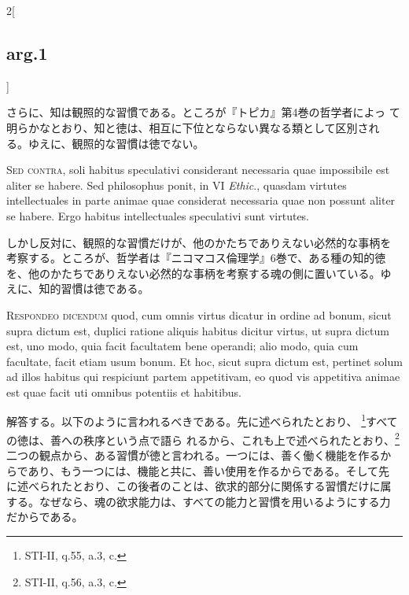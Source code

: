 \documentclass[paper=a4paper,fontsize=10pt,jafontsize=9pt,titlepage]{jlreq}
\begin{document}
\begin{paracol}{2}[\subsection{arg.1}]
\switchcolumn

さらに、知は観照的な習慣である。ところが『トピカ』第4巻の哲学者によっ
て明らかなとおり、知と徳は、相互に下位とならない異なる類として区別され
る。ゆえに、観照的な習慣は徳でない。

\switchcolumn*[\subsection{s.c.}]

{\scshape Sed contra}, soli habitus speculativi considerant necessaria
 quae impossibile est aliter se habere. Sed philosophus ponit, in VI
 {\itshape Ethic}., quasdam virtutes intellectuales in parte animae
 quae considerat necessaria quae non possunt aliter se habere. Ergo
 habitus intellectuales speculativi sunt virtutes.

\switchcolumn

しかし反対に、観照的な習慣だけが、他のかたちでありえない必然的な事柄を
考察する。ところが、哲学者は『ニコマコス倫理学』6巻で、ある種の知的徳
を、他のかたちでありえない必然的な事柄を考察する魂の側に置いている。ゆ
えに、知的習慣は徳である。


{\scshape Respondeo dicendum} quod, cum omnis virtus dicatur in ordine
ad bonum, sicut supra dictum est, duplici ratione aliquis habitus
dicitur virtus, ut supra dictum est, uno modo, quia facit facultatem
bene operandi; alio modo, quia cum facultate, facit etiam usum
bonum. Et hoc, sicut supra dictum est, pertinet solum ad illos habitus
qui respiciunt partem appetitivam, eo quod vis appetitiva animae est
quae facit uti omnibus potentiis et habitibus.

\switchcolumn

解答する。以下のように言われるべきである。先に述べられたとおり、
\footnote{STI-II, q.55, a.3, c.}すべての徳は、善への秩序という点で語ら
れるから、これも上で述べられたとおり、\footnote{STI-II, q.56, a.3, c.}
二つの観点から、ある習慣が徳と言われる。一つには、善く働く機能を作るか
らであり、もう一つには、機能と共に、善い使用を作るからである。そして先
に述べられたとおり、この後者のことは、欲求的部分に関係する習慣だけに属
する。なぜなら、魂の欲求能力は、すべての能力と習慣を用いるようにする力
だからである。

\switchcolumn*


\end{paracol}
\end{document}
